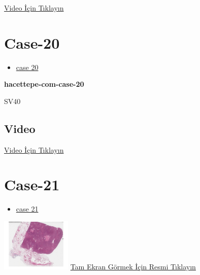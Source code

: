 \documentclass[
  letterpaper,
  DIV=11,
  numbers=noendperiod]{scrreprt}
\providecommand{\tightlist}{%
  \setlength{\itemsep}{0pt}\setlength{\parskip}{0pt}}\usepackage{longtable,booktabs,array}
\begin{document}
\href{https://www.youtube.com/watch?v=SaNDCvKzQ6M}{Video İçin Tıklayın}

\hypertarget{sec-hacettepe-case-of-the-month-case-20}{%
\section{Case-20}\label{sec-hacettepe-case-of-the-month-case-20}}

\begin{itemize}
\tightlist
\item
  \href{https://www.youtube.com/watch?v=f8nE-6oR5VI\&ab_channel=KemalKosemehmetoglu}{case
  20}
\end{itemize}

\textbf{hacettepe-com-case-20}

\begin{tcolorbox}[enhanced jigsaw, left=2mm, toprule=.15mm, rightrule=.15mm, bottomrule=.15mm, leftrule=.75mm, colback=white, colframe=quarto-callout-tip-color-frame, toptitle=1mm, breakable, titlerule=0mm, colbacktitle=quarto-callout-tip-color!10!white, bottomtitle=1mm, title=\textcolor{quarto-callout-tip-color}{\faLightbulb}\hspace{0.5em}{Tanı}, arc=.35mm, opacitybacktitle=0.6, opacityback=0, coltitle=black]

SV40

\end{tcolorbox}

\hypertarget{video-18}{%
\subsection{Video}\label{video-18}}

\href{https://www.youtube.com/watch?v=f8nE-6oR5VI}{Video İçin Tıklayın}

\hypertarget{sec-hacettepe-case-of-the-month-case-21}{%
\section{Case-21}\label{sec-hacettepe-case-of-the-month-case-21}}

\begin{itemize}
\tightlist
\item
  \href{https://www.youtube.com/watch?v=Uith4SvB2_Q\&ab_channel=KemalKosemehmetoglu}{case
  21}
\end{itemize}

\href{https://images.patolojiatlasi.com/hacettepe-com-case-21/HE.html}{\includegraphics[width=0.25\textwidth,height=\textheight]{./screenshots/hacettepe-com-case-21_screenshot.png}}
\href{https://images.patolojiatlasi.com/hacettepe-com-case-21/HE.html}{Tam
Ekran Görmek İçin Resmi Tıklayın}
\end{document}
